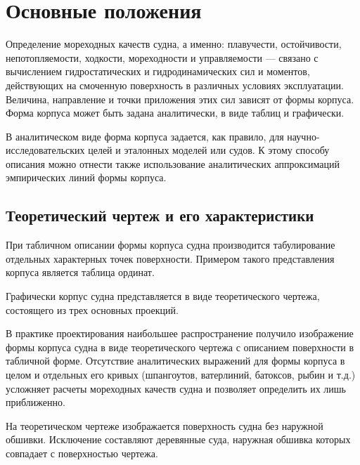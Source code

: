 \chapter{Основные положения}

Определение мореходных качеств судна, а именно: плавучести, остойчивости, непотопляемости, ходкости, мореходности и управляемости — связано с вычислением гидростатических и гидродинамических сил и моментов, действующих на смоченную поверхность в различных условиях эксплуатации.
Величина, направление и точки приложения этих сил зависят от формы корпуса.
Форма корпуса может быть задана аналитически, в виде таблиц и графически.

В аналитическом виде форма корпуса задается, как правило, для научно-\-иссле\-дова\-тельских целей и эталонных моделей или судов.
К этому способу описания можно отнести также использование аналитических аппроксимаций эмпирических линий формы корпуса.

\section{Теоретический чертеж и его характеристики}

При табличном описании формы корпуса судна производится табулирование отдельных характерных точек поверхности. Примером такого представления корпуса является таблица ординат.

Графически корпус судна представляется в виде теоретического чертежа, состоящего из трех основных проекций.

В практике проектирования наибольшее распространение получило изображение формы корпуса судна в виде теоретического чертежа с описанием поверхности в табличной форме.
Отсутствие аналитических выражений для формы корпуса в целом и отдельных его кривых (шпангоутов, ватерлиний, батоксов, рыбин и т.д.) усложняет расчеты мореходных качеств судна и позволяет определить их лишь приближенно.

На теоретическом чертеже изображается поверхность судна без наружной обшивки.
Исключение составляют деревянные суда, наружная обшивка которых совпадает с поверхностью чертежа.

